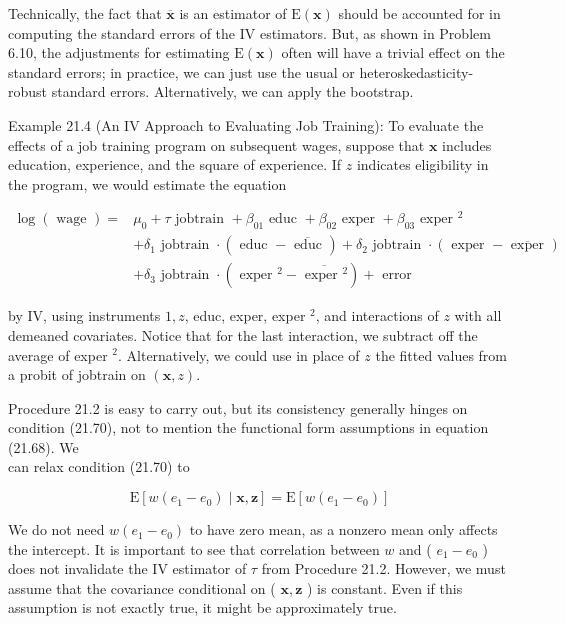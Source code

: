 \documentclass[10pt]{article}
\begin{document}
Technically, the fact that $\overline{\mathbf{x}}$ is an estimator of $\mathrm{E}(\mathbf{x})$ should be accounted for in computing the standard errors of the IV estimators. But, as shown in Problem 6.10, the adjustments for estimating $\mathrm{E}(\mathbf{x})$ often will have a trivial effect on the standard errors; in practice, we can just use the usual or heteroskedasticity-robust standard errors. Alternatively, we can apply the bootstrap.

Example 21.4 (An IV Approach to Evaluating Job Training): To evaluate the effects of a job training program on subsequent wages, suppose that $\mathbf{x}$ includes education, experience, and the square of experience. If $z$ indicates eligibility in the program, we would estimate the equation

$$
\begin{aligned}
\log (\text { wage })= & \mu_{0}+\tau \text { jobtrain }+\beta_{01} \text { educ }+\beta_{02} \text { exper }+\beta_{03} \text { exper }^{2} \\
& +\delta_{1} \text { jobtrain } \cdot(\text { educ }-\overline{\text { educ }})+\delta_{2} \text { jobtrain } \cdot(\text { exper }-\overline{\text { exper }}) \\
& +\delta_{3} \text { jobtrain } \cdot\left(\text { exper }^{2}-\overline{\text { exper }^{2}}\right)+\text { error }
\end{aligned}
$$

by IV, using instruments $1, z$, educ, exper, exper ${ }^{2}$, and interactions of $z$ with all demeaned covariates. Notice that for the last interaction, we subtract off the average of exper ${ }^{2}$. Alternatively, we could use in place of $z$ the fitted values from a probit of jobtrain on $(\mathbf{x}, z)$.

Procedure 21.2 is easy to carry out, but its consistency generally hinges on condition (21.70), not to mention the functional form assumptions in equation (21.68). We\\
can relax condition (21.70) to


\begin{equation*}
\mathrm{E}\left[w\left(e_{1}-e_{0}\right) \mid \mathbf{x}, \mathbf{z}\right]=\mathrm{E}\left[w\left(e_{1}-e_{0}\right)\right] \tag{21.72}
\end{equation*}


We do not need $w\left(e_{1}-e_{0}\right)$ to have zero mean, as a nonzero mean only affects the intercept. It is important to see that correlation between $w$ and ( $e_{1}-e_{0}$ ) does not invalidate the IV estimator of $\tau$ from Procedure 21.2. However, we must assume that the covariance conditional on ( $\mathbf{x}, \mathbf{z}$ ) is constant. Even if this assumption is not exactly true, it might be approximately true.
\end{document}
